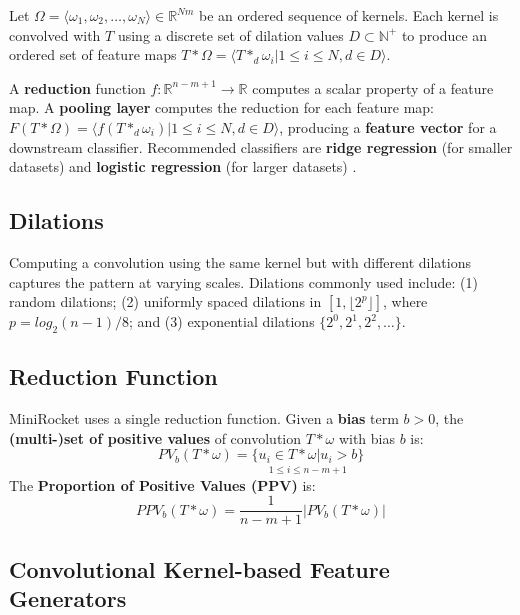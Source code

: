 Let $\Omega = \langle\omega_1, \omega_2, \ldots, \omega_N\rangle \in \mathbb{R}^{Nm}$ be an ordered sequence of kernels. Each kernel is convolved with $T$ using a discrete set of dilation values $D \subset \mathbb{N}^+$ to produce an ordered set of feature maps $T * \Omega = \langle T*_d\omega_i| 1 \leq i \leq N, d \in D\rangle$.

A \textbf{reduction} function $f: \mathbb{R}^{n-m+1} \rightarrow \mathbb{R}$ computes a scalar property of a feature map.
A \textbf{pooling layer} computes the reduction for each feature map: $F(T * \Omega) = \langle f(T*_d\omega_i)| 1 \leq i \leq N, d \in D\rangle$,
 producing a \textbf{feature vector} for a downstream classifier.
Recommended classifiers are \textbf{ridge regression} (for smaller datasets) and \textbf{logistic regression} (for larger datasets) \cite{Rocket}.

\subsection{Dilations}
\label{sec:Dilations}

Computing a convolution using the same kernel but with different dilations captures the pattern at varying scales.
Dilations commonly used include: (1) random dilations; (2) uniformly spaced dilations in $[1, \lfloor 2^p \rfloor]$, where $p = log_2(n-1)/8$; and (3) exponential dilations $\{2^0, 2^1, 2^2, \ldots \}$.

\subsection{Reduction Function}
\label{sec:Reductions}

MiniRocket uses a single reduction function. Given a \textbf{bias} term $b > 0$, the \textbf{(multi-)set of positive values} of convolution $T * \omega$ with bias $b$ is:
\begin{equation}
    PV_b(T * \omega) = \underset{1 \leq i \leq n-m+1}{\{ u_i \in T*\omega|u_i > b \}}
    \label{eq:pv}
\end{equation}
The \textbf{Proportion of Positive Values (PPV)} is:
\begin{equation}
    PPV_b(T*\omega) =\frac{1}{n-m+1}\biggl| PV_b(T*\omega)\biggr|
    \label{eq:ppv}
\end{equation}

\subsection{Convolutional Kernel-based Feature Generators}
\label{sec:Classifiers}

